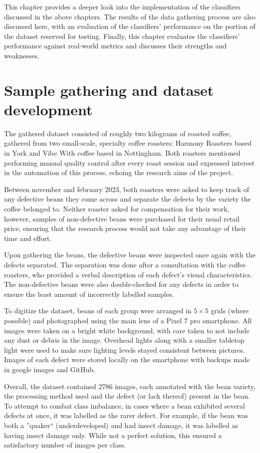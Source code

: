 This chapter provides a deeper look into the implementation of the classifiers discussed in the above chapters.
The results of the data gathering process are also discussed here, with an evaluation of the classifiers' performance on the
portion of the dataset reserved for testing.
Finally, this chapter evaluates the classifiers' performance against real-world metrics and discusses their strengths and weaknesses.


\section{Sample gathering and dataset development}
\label{sec:sample-gathering-and-dataset-development}
The gathered dataset consisted of roughly two kilograms of roasted coffee, gathered
from two small-scale, specialty coffee roasters: Harmony Roasters based in York and Vibe
With coffee based in Nottingham.
Both roasters mentioned performing manual quality control
after every roast session and expressed interest in the automation of this process,
echoing the research aims of the project.

Between november and february 2023, both roasters were asked
to keep track of any defective beans they come across and separate the defects by
the variety the coffee belonged to.
Neither roaster asked for compensation for
their work, however, samples of non-defective beans were purchased for their usual
retail price, ensuring that the research process would not take any advantage of
their time and effort.

Upon gathering the beans, the defective beans were inspected once again with the defects separated.
The separation was done after a
consultation with the coffee roasters, who provided a verbal description of each
defect's visual characteristics.
The non-defective beans were also double-checked
for any defects in order to ensure the least amount of incorrectly labelled
samples.

To digitize the dataset, beans of each group were arranged in $5 \times 5$ grids
(where possible) and photographed using the main lens of a Pixel 7 pro smartphone.
All images were taken on a bright white background, with care taken to not include any dust or debris in the image.
Overhead lights along with a smaller tabletop light were used to make sure lighting levels stayed consistent between pictures.
Images of each defect were stored locally on the smartphone with backups made
in google images and GitHub.

Overall, the dataset contained 2786 images, each annotated with the bean variety,
the processing method used and the defect (or lack thereof) present in the bean.
To attempt to combat class imbalance, in cases where a bean
exhibited several defects at once, it was labelled as the rarer defect.
For
example, if the bean was both a ''quaker`` (underdeveloped) and had insect damage,
it was labelled as having insect damage only.
While not a perfect solution, this
ensured a satisfactory number of images per class.

